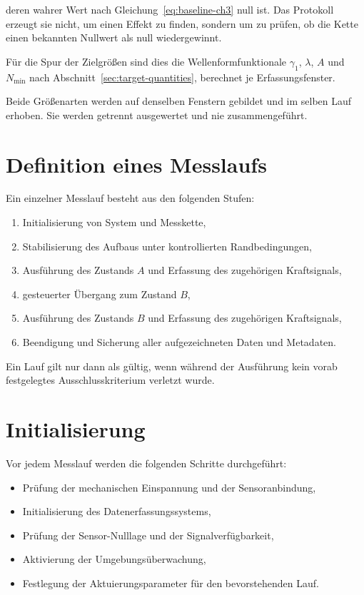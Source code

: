 \documentclass[12pt,a4paper]{report}
\begin{document}
deren wahrer Wert nach Gleichung~\eqref{eq:baseline-ch3} null ist. Das
Protokoll erzeugt sie nicht, um einen Effekt zu finden, sondern um zu
prüfen, ob die Kette einen bekannten Nullwert als null wiedergewinnt.

Für die Spur der Zielgrößen sind dies die Wellenformfunktionale
$\gamma_1$, $\lambda$, $A$ und $N_{\min}$ nach
Abschnitt~\ref{sec:target-quantities}, berechnet je Erfassungsfenster.

Beide Größenarten werden auf denselben Fenstern gebildet und im selben
Lauf erhoben. Sie werden getrennt ausgewertet und nie zusammengeführt.

\section{Definition eines Messlaufs}

Ein einzelner Messlauf besteht aus den folgenden Stufen:

\begin{enumerate}
\item Initialisierung von System und Messkette,
\item Stabilisierung des Aufbaus unter kontrollierten Randbedingungen,
\item Ausführung des Zustands $A$ und Erfassung des zugehörigen
      Kraftsignals,
\item gesteuerter Übergang zum Zustand $B$,
\item Ausführung des Zustands $B$ und Erfassung des zugehörigen
      Kraftsignals,
\item Beendigung und Sicherung aller aufgezeichneten Daten und
      Metadaten.
\end{enumerate}

Ein Lauf gilt nur dann als gültig, wenn während der Ausführung kein
vorab festgelegtes Ausschlusskriterium verletzt wurde.

\section{Initialisierung}

Vor jedem Messlauf werden die folgenden Schritte durchgeführt:

\begin{itemize}
\item Prüfung der mechanischen Einspannung und der Sensoranbindung,
\item Initialisierung des Datenerfassungssystems,
\item Prüfung der Sensor-Nulllage und der Signalverfügbarkeit,
\item Aktivierung der Umgebungsüberwachung,
\item Festlegung der Aktuierungsparameter für den bevorstehenden Lauf.
\end{itemize}
\end{document}
